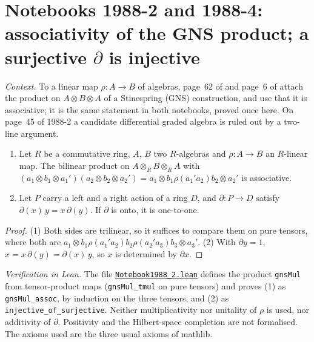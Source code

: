 \section[Notebooks 1988-2 and 1988-4: the GNS product; a surjective $\partial$]{Notebooks 1988-2 and 1988-4: associativity of the GNS product; a surjective $\partial$ is injective\protect{}}\label{sec:quillen-1988-2}

\emph{Context.} To a linear map $\rho : A \to B$ of algebras, page~62 of  and page~6 of  attach the product on $A \otimes B \otimes A$ of a Stinespring (GNS) construction, and use that it is associative; it is the same statement in both notebooks, proved once here. On page~45 of 1988-2 a candidate differential graded algebra is ruled out by a two-line argument.

\begin{encadre}
\begin{theoreme}\label{thm:quillen-1988-2}\leavevmode
\begin{enumerate}
\item Let $R$ be a commutative ring, $A$, $B$ two $R$-algebras and $\rho : A \to B$ an $R$-linear map. The bilinear product on $A \otimes_R B \otimes_R A$ with $(a_1 \otimes b_1 \otimes a_1')(a_2 \otimes b_2 \otimes a_2') = a_1 \otimes b_1\rho(a_1'a_2)b_2 \otimes a_2'$ is associative.
\item Let $P$ carry a left and a right action of a ring $D$, and $\partial : P \to D$ satisfy $\partial(x)\,y = x\,\partial(y)$. If $\partial$ is onto, it is one-to-one.
\end{enumerate}
\end{theoreme}
\end{encadre}

\begin{proof}
(1) Both sides are trilinear, so it suffices to compare them on pure tensors, where both are $a_1 \otimes b_1\rho(a_1'a_2)b_2\rho(a_2'a_3)b_3 \otimes a_3'$. (2) With $\partial y = 1$, $x = x\,\partial(y) = \partial(x)\,y$, so $x$ is determined by $\partial x$.
\end{proof}

\emph{Verification in Lean.} The file \href{\leanblobmain/Notebook1988_2.lean}{\texttt{Notebook1988\_2.\allowbreak{}lean}} defines the product \texttt{gnsMul} from tensor-product maps (\texttt{gnsMul\_tmul} on pure tensors) and proves (1) as \texttt{gnsMul\_assoc}, by induction on the three tensors, and (2) as \texttt{injective\_of\_surjective}. Neither multiplicativity nor unitality of $\rho$ is used, nor additivity of $\partial$. Positivity and the Hilbert-space completion are not formalised. The axioms used are the three usual axioms of mathlib.

